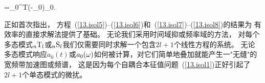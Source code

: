 {{{{=\half\sse_0^{\rm T}(\om-\om_0)\ssv_0.
\en

正如\textcite{woodhouse&girnius82}首次指出，
方程~(\ref{13.isol5})--(\ref{13.isol6})和~(\ref{13.isol7})--(\ref{13.isol8})的结果为
有效率的直接求解法提供了基础。
无论我们采用时间域抑或频率域的方法，
对每个多态模式${}_n{\rm T}_l$或${}_n{\rm S}_l$我们仅需要同时求解一个包含$2l+1$个线性方程的系统。
无论多态模式响应$a_0(t)$或$a_0(\mbox{$\omega$})$如何被计算，对它们简单地叠加就能产生一"无缝"的宽频带加速图或频谱，
这是因为每个自耦合本征值问题~(\ref{13.isol1})正好引起了$2l+1$个单态模式的微扰。

}}}}
